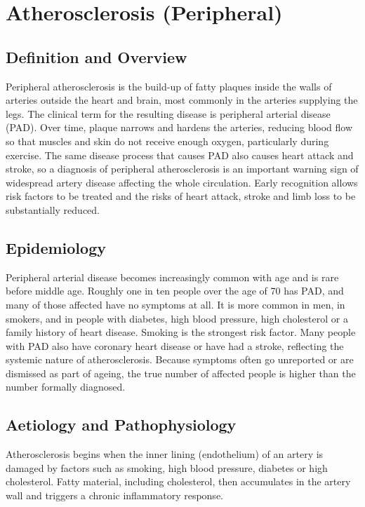 \chapter{Atherosclerosis (Peripheral)}

\section*{Definition and Overview}
Peripheral atherosclerosis is the build-up of fatty plaques inside the walls of arteries outside the heart and brain, most commonly in the arteries supplying the legs. The clinical term for the resulting disease is peripheral arterial disease (PAD). Over time, plaque narrows and hardens the arteries, reducing blood flow so that muscles and skin do not receive enough oxygen, particularly during exercise. The same disease process that causes PAD also causes heart attack and stroke, so a diagnosis of peripheral atherosclerosis is an important warning sign of widespread artery disease affecting the whole circulation. Early recognition allows risk factors to be treated and the risks of heart attack, stroke and limb loss to be substantially reduced.

\section*{Epidemiology}
Peripheral arterial disease becomes increasingly common with age and is rare before middle age. Roughly one in ten people over the age of 70 has PAD, and many of those affected have no symptoms at all. It is more common in men, in smokers, and in people with diabetes, high blood pressure, high cholesterol or a family history of heart disease. Smoking is the strongest risk factor. Many people with PAD also have coronary heart disease or have had a stroke, reflecting the systemic nature of atherosclerosis. Because symptoms often go unreported or are dismissed as part of ageing, the true number of affected people is higher than the number formally diagnosed.

\section*{Aetiology and Pathophysiology}
Atherosclerosis begins when the inner lining (endothelium) of an artery is damaged by factors such as smoking, high blood pressure, diabetes or high cholesterol. Fatty material, including cholesterol, then accumulates in the artery wall and triggers a chronic inflammatory response.

